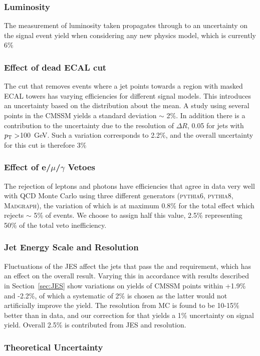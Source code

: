 \subsubsection{Luminosity}
The measurement of luminosity taken propagates through to an uncertainty on the signal event yield when considering any new physics model, which is currently 6\%~\cite{EWK-11-001}
\subsubsection{Effect of dead ECAL cut}
The cut that removes events where a jet points towards a region with masked ECAL towers has varying efficiencies for different signal models. This introduces an uncertainty based on the distribution about the mean. A study using several points in the CMSSM yields a standard deviation $\sim$ 2\%. In addition there is a contribution to the uncertainty due to the resolution of $\Delta R$, 0.05 for jets with ${p_{\text T}} >$100~GeV. Such a variation corresponds to 2.2\%, and the overall uncertainty for this cut is therefore 3\%
\subsubsection{Effect of e/$\mu$/$\gamma$ Vetoes}
The rejection of leptons and photons have efficiencies that agree in data very well with QCD Monte Carlo using three different generators (\textsc{pythia6, pythia8, Madgraph}), the variation of which is at maximum 0.8\% for the total effect which rejects $\sim$ 5\% of events. We choose to assign half this value, 2.5\% representing 50\% of the total veto inefficiency.

\subsubsection{Jet Energy Scale and Resolution}
Fluctuations of the JES affect the jets that pass the \Pt and \HT requirement, which has an effect on the overall result. Varying this in accordance with results described in Section~\ref{sec:JES} show variations on yields of CMSSM points within +1.9\% and -2.2\%, of which a systematic of 2\% is chosen as the latter would not artificially improve the yield. The resolution from MC is found to be 10-15\% better than in data, and our correction for that yields a 1\% uncertainty on signal yield. Overall 2.5\% is contributed from JES and resolution.

\subsubsection{Theoretical Uncertainty}

